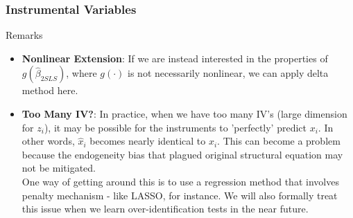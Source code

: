 \documentclass{beamer}
\begin{document}
\begin{frame}
\frametitle{Instrumental Variables}
Remarks
\begin{itemize}
\item \textbf{Nonlinear Extension}: If we are instead interested in the properties of $g(\hat{\beta}_{2SLS})$, where $g(\cdot)$ is not necessarily nonlinear, we can apply delta method here. 
\item \textbf{Too Many IV?}: In practice, when we have too many IV's (large dimension for $z_i$), it may be possible for the instruments to 'perfectly' predict $x_i$. In other words, $\hat{x}_i$ becomes nearly identical to $x_i$. This can become a problem because the endogeneity bias that plagued original structural equation may not be mitigated. \\
One way of getting around this is to use a regression method that involves penalty mechanism - like LASSO, for instance. We will also formally treat this issue when we learn over-identification tests in the near future. 
\end{itemize}
\end{frame}
\end{document}
